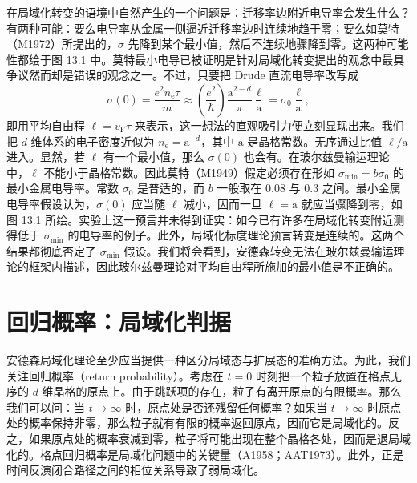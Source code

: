 在局域化转变的语境中自然产生的一个问题是：迁移率边附近电导率会发生什么？有两种可能：要么电导率从金属一侧逼近迁移率边时连续地趋于零；要么如莫特（M1972）所提出的，$\sigma$ 先降到某个最小值，然后不连续地骤降到零。这两种可能性都绘于图 13.1 中。莫特最小电导已被证明是针对局域化转变提出的观念中最具争议然而却是错误的观念之一。不过，只要把 Drude 直流电导率改写成
\begin{equation*}
\sigma(0)=\frac{e^{2}n_{\mathrm{e}}\tau}{m}\approx\left(\frac{e^{2}}{\hbar}\right)\frac{\mathrm{a}^{2-d}}{\pi}\frac{\ell}{\mathrm{a}}=\sigma_{0}\frac{\ell}{\mathrm{a}},\tag{13.2}
\end{equation*}
即用平均自由程 $\ell=v_{\mathrm{F}}\tau$ 来表示，这一想法的直观吸引力便立刻显现出来。我们把 $d$ 维体系的电子密度近似为 $n_{\mathrm{e}}=\mathrm{a}^{-d}$，其中 $\mathrm{a}$ 是晶格常数。无序通过比值 $\ell/\mathrm{a}$ 进入。显然，若 $\ell$ 有一个最小值，那么 $\sigma(0)$ 也会有。在玻尔兹曼输运理论中，$\ell$ 不能小于晶格常数。因此莫特（M1949）假定必须存在形如 $\sigma_{\mathrm{min}}=b\sigma_{0}$ 的最小金属电导率。常数 $\sigma_{0}$ 是普适的，而 $b$ 一般取在 0.08 与 0.3 之间。最小金属电导率假设认为，$\sigma(0)$ 应当随 $\ell$ 减小，因而一旦 $\ell=\mathrm{a}$ 就应当骤降到零，如图 13.1 所绘。实验上这一预言并未得到证实：如今已有许多在局域化转变附近测得低于 $\sigma_{\mathrm{min}}$ 的电导率的例子。此外，局域化标度理论预言转变是连续的。这两个结果都彻底否定了 $\sigma_{\mathrm{min}}$ 假设。我们将会看到，安德森转变无法在玻尔兹曼输运理论的框架内描述，因此玻尔兹曼理论对平均自由程所施加的最小值是不正确的。

\section{回归概率：局域化判据}

安德森局域化理论至少应当提供一种区分局域态与扩展态的准确方法。为此，我们关注回归概率（return probability）。考虑在 $t=0$ 时刻把一个粒子放置在格点无序的 $d$ 维晶格的原点上。由于跳跃项的存在，粒子有离开原点的有限概率。那么我们可以问：当 $t\to\infty$ 时，原点处是否还残留任何概率？如果当 $t\to\infty$ 时原点处的概率保持非零，那么粒子就有有限的概率返回原点，因而它是局域化的。反之，如果原点处的概率衰减到零，粒子将可能出现在整个晶格各处，因而是退局域化的。格点回归概率是局域化问题中的关键量（A1958；AAT1973）。此外，正是时间反演闭合路径之间的相位关系导致了弱局域化。

